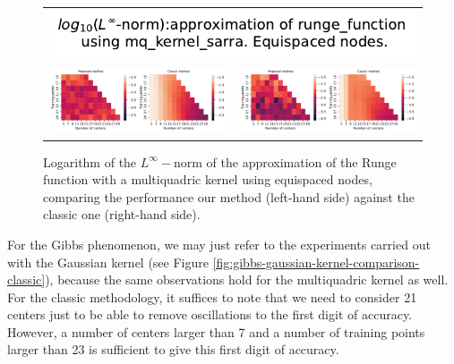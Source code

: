 \documentclass[12pt]{report} %
\begin{document}
\begin{figure}[h]
  \begin{tabular}{cc}
    \multicolumn{2}{c}{{\includegraphics[width=.5\textwidth]
    {imagenes/experiments/1d/variational/linf_runge_function_mq_kernel_sarra_Equi_Classic_Title.pdf}}}                                                                                       \\
    {\includegraphics[height=.4\textwidth, trim={0 0 11.5cm 0},clip=true]
    {imagenes/experiments/1d/variational/linf_runge_function_mq_kernel_sarra_Equi_Classic_Comparison.pdf}}  &
     {\includegraphics[height=.4\textwidth, trim={9.5cm 0 0 0},clip=true]{imagenes/experiments/1d/variational/linf_runge_function_gaussian_kernel_Equi_Classic_Comparison.pdf}} \\
  \end{tabular}
  \caption{Logarithm of the $L^\infty-$norm of the approximation of the Runge function with a multiquadric kernel using equispaced nodes, comparing the performance our method (left-hand side) against the classic one (right-hand side).}
  \label{fig:runge-mq-sarra-kernel-comparison-equi-classic}
\end{figure}

For the Gibbs phenomenon, we may just refer to the experiments carried out
with the Gaussian kernel (see Figure
\ref{fig:gibbs-gaussian-kernel-comparison-classic}), because the same
observations hold for the multiquadric kernel as well. For the
classic methodology, it suffices to note that we need to consider
21 centers just to be able to remove oscillations to the first digit of
accuracy. However, a number of centers larger than 7 and a number of training
points larger than 23 is sufficient to give this first digit of accuracy.
\end{document}
